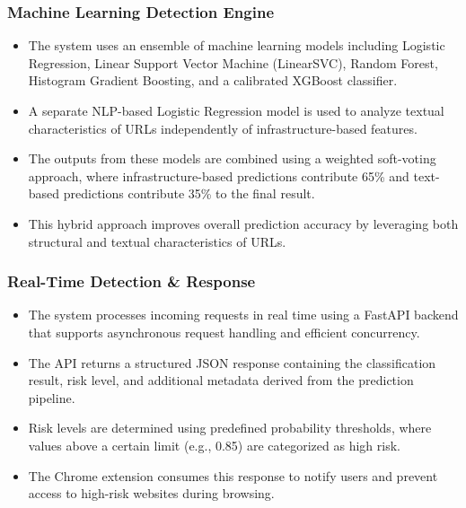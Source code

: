 \subsubsection*{Machine Learning Detection Engine}

\begin{itemize}
    \item The system uses an ensemble of machine learning models including Logistic Regression, Linear Support Vector Machine (LinearSVC), Random Forest, Histogram Gradient Boosting, and a calibrated XGBoost classifier.
    
    \item A separate NLP-based Logistic Regression model is used to analyze textual characteristics of URLs independently of infrastructure-based features.
    
    \item The outputs from these models are combined using a weighted soft-voting approach, where infrastructure-based predictions contribute 65\% and text-based predictions contribute 35\% to the final result.
    
    \item This hybrid approach improves overall prediction accuracy by leveraging both structural and textual characteristics of URLs.
\end{itemize}

\subsubsection*{Real-Time Detection \& Response}

\begin{itemize}
    \item The system processes incoming requests in real time using a FastAPI backend that supports asynchronous request handling and efficient concurrency.
    
    \item The API returns a structured JSON response containing the classification result, risk level, and additional metadata derived from the prediction pipeline.
    
    \item Risk levels are determined using predefined probability thresholds, where values above a certain limit (e.g., 0.85) are categorized as high risk.
    
    \item The Chrome extension consumes this response to notify users and prevent access to high-risk websites during browsing.
\end{itemize}

